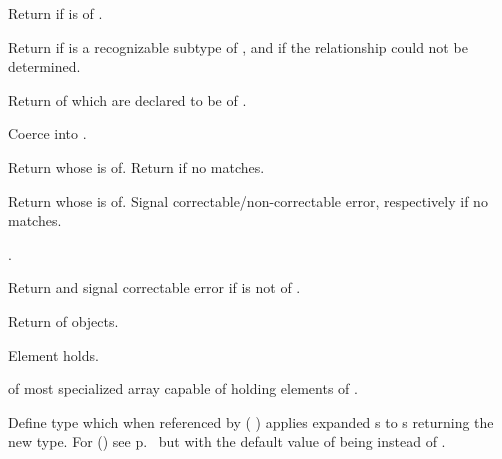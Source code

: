 \begin{LIST}{1cm}

  {
  Return \retval{\T} if  is of .
  }

  {
  Return \retval{\T} if  is a recognizable subtype of
  , and \retvalii{\NIL} if the relationship could not be
  determined. 
  }

  {
  Return  of  which are declared to be of
  . 
  }

  {
  Coerce  into .
  }

  {
  Return  whose  is
   of. Return  if no
   matches.
  }

  {
  Return  whose  is
   of. Signal correctable/non-correctable error, respectively
  if no  matches.
  }

  {
  .
  }

  {
  Return \retval{\NIL} and signal correctable error if  is
  not of . 
  }

  {
  Return  of  objects.
  }

  {
  Element   holds.
  }

  {
   of most specialized array capable of holding
  elements of . 
  }

  {
  Define type  which when referenced by (
  ) applies expanded s to s
  returning the new type. For () see
  p.~\pageref{section:Macros} but with the default value of 
  being \kwd{\A} instead of \NIL.
  }


\end{LIST}

